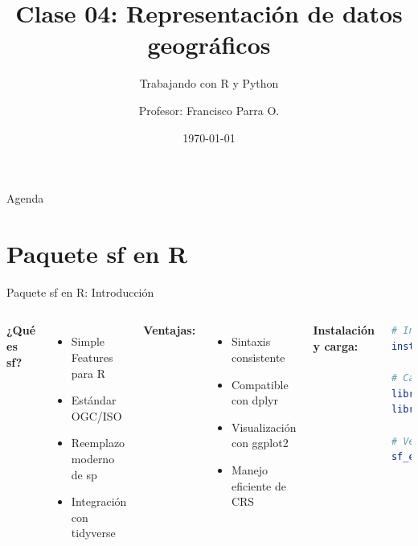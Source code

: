 \documentclass[10pt,aspectratio=169]{beamer}
\title{Clase 04: Representación de datos geográficos}
\subtitle{Trabajando con R y Python}
\author{Profesor: Francisco Parra O.}
\institute{USACH - Ingeniería Civil en Informática}
\date{\today}
\begin{document}
\maketitle

\begin{frame}{Agenda}
    \tableofcontents[hideallsubsections]
\end{frame}

\section{Paquete sf en R}

\begin{frame}[fragile]{Paquete sf en R: Introducción}
    \begin{columns}[T]
        \textbf{¿Qué es sf?}
        \begin{itemize}
            \item Simple Features para R
            \item Estándar OGC/ISO
            \item Reemplazo moderno de sp
            \item Integración con tidyverse
        \end{itemize}
        
        \vspace{0.3cm}
        \textbf{Ventajas:}
        \begin{itemize}
            \item Sintaxis consistente
            \item Compatible con dplyr
            \item Visualización con ggplot2
            \item Manejo eficiente de CRS
        \end{itemize}
        
        \textbf{Instalación y carga:}
        \begin{lstlisting}[language=R]
# Instalación
install.packages("sf")

# Carga
library(sf)
library(tidyverse)

# Verificar instalación
sf_extSoftVersion()
        \end{lstlisting}
    \end{columns}
\end{frame}
\end{document}
